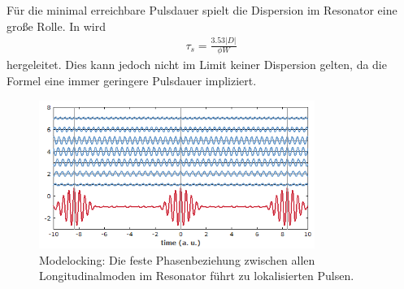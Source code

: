 \documentclass[bachelor,       %
               twoside,        %
               BCOR10mm,       %
               liststotoc,nomtotoc,bibtotoc, %
               english,ngerman, %
               final,          %
               ]{GAUBM}
\begin{document}
Für die minimal erreichbare Pulsdauer spielt die Dispersion im Resonator eine große Rolle.
In \cite{spielmann_ultrabroadband_1994} wird
\begin{align}
	\tau_s=\frac{3.53 |D|}{\phi W}
\end{align}
hergeleitet.
Dies kann jedoch nicht im Limit keiner Dispersion gelten, da die Formel eine immer geringere Pulsdauer impliziert.
\begin{figure}[!htb]
	\centering
	\includegraphics[width=0.8\textwidth]{figures/ML_pulse_train_synthesis2.png}
	\caption{Modelocking\protect\footnotemark: Die feste Phasenbeziehung zwischen allen \protect\\ Longitudinalmoden im Resonator führt zu lokalisierten Pulsen.}
	\label{fig:ML_RP}
\end{figure}

\end{document}
